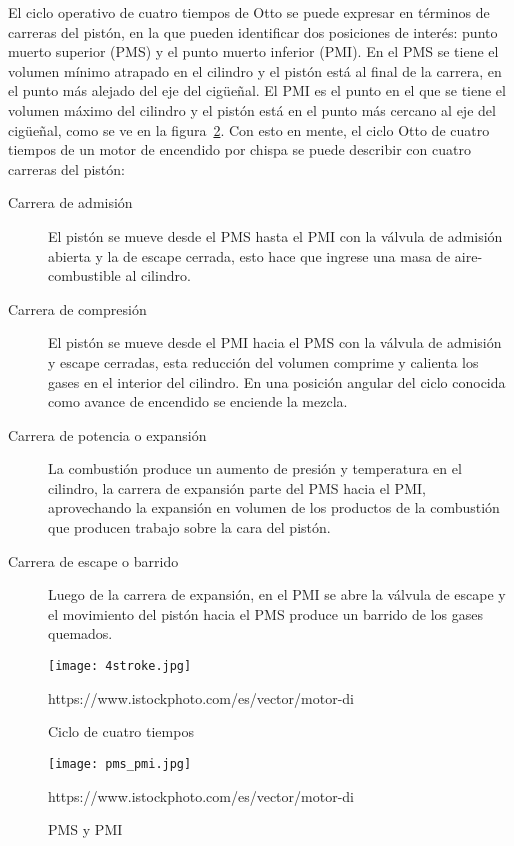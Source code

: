 El ciclo operativo de cuatro tiempos de Otto se puede expresar en términos de
carreras del pistón, en la que pueden identificar dos posiciones de interés:
punto muerto superior (PMS) y el punto muerto inferior (PMI).
%
En el PMS se tiene el volumen mínimo atrapado en el cilindro y el pistón está al
final de la carrera, en el punto más alejado del eje del cigüeñal.
%
El PMI es el punto en el que se tiene el volumen máximo del cilindro y el pistón
está en el punto más cercano al eje del cigüeñal, como se ve en la
figura~\ref{fig:pms_pmi}.
%
Con esto en mente, el ciclo Otto de cuatro tiempos de un motor de encendido por
chispa se puede describir con cuatro carreras del pistón:
%
\begin{description}
%
    \item [Carrera de admisión] El pistón se mueve desde el PMS hasta el PMI con
la válvula de admisión abierta y la de escape cerrada, esto hace que ingrese una
masa de aire-combustible al cilindro.
%
    \item [Carrera de compresión] El pistón se mueve desde el PMI hacia el PMS
con la válvula de admisión y escape cerradas, esta reducción del volumen
comprime y calienta los gases en el interior del cilindro.
        En una posición angular del ciclo conocida como avance de encendido se
enciende la mezcla.
%
    \item [Carrera de potencia o expansión] La combustión produce un aumento de
presión y temperatura en el cilindro, la carrera de expansión parte del PMS
hacia el PMI, aprovechando la expansión en volumen de los productos de la
combustión que producen trabajo sobre la cara del pistón.
%
    \item [Carrera de escape o barrido] Luego de la carrera de expansión, en el
PMI se abre la válvula de escape y el movimiento del pistón hacia el PMS produce
un barrido de los gases quemados.
%
\end{description}

\begin{figure} \centering \texttt{[image: 4stroke.jpg]}
    \caption{Ciclo de cuatro tiempos}\label{fig:4tiempos} %
https://www.istockphoto.com/es/vector/motor-di%
\end{figure}


\begin{figure} \centering \texttt{[image: pms\_pmi.jpg]}
    \caption{PMS y PMI}\label{fig:pms_pmi} %
https://www.istockphoto.com/es/vector/motor-di%
\end{figure}


